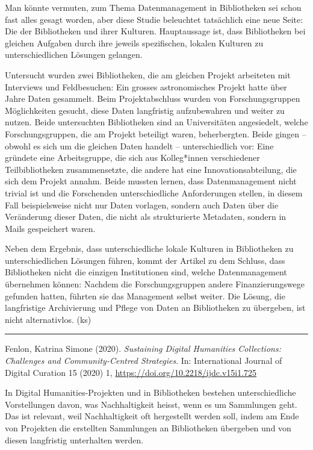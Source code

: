 \documentclass[a4paper,
fontsize=11pt,
oneside,
numbers=noperiodatend,
parskip=half-,
bibliography=totoc,
final
]{scrartcl}
\begin{document}
Man könnte vermuten, zum Thema Datenmanagement in Bibliotheken sei schon
fast alles gesagt worden, aber diese Studie beleuchtet tatsächlich eine
neue Seite: Die der Bibliotheken und ihrer Kulturen. Hauptaussage ist,
dass Bibliotheken bei gleichen Aufgaben durch ihre jeweils spezifischen,
lokalen Kulturen zu unterschiedlichen Lösungen gelangen.

Untersucht wurden zwei Bibliotheken, die am gleichen Projekt arbeiteten
mit Interviews und Feldbesuchen: Ein grosses astronomisches Projekt
hatte über Jahre Daten gesammelt. Beim Projektabschluss wurden von
Forschungsgruppen Möglichkeiten gesucht, diese Daten langfristig
aufzubewahren und weiter zu nutzen. Beide untersuchten Bibliotheken sind
an Universitäten angesiedelt, welche Forschungsgruppen, die am Projekt
beteiligt waren, beherbergten. Beide gingen -- obwohl es sich um die
gleichen Daten handelt -- unterschiedlich vor: Eine gründete eine
Arbeitsgruppe, die sich aus Kolleg*innen verschiedener Teilbibliotheken
zusammensetzte, die andere hat eine Innovationsabteilung, die sich dem
Projekt annahm. Beide mussten lernen, dass Datenmanagement nicht trivial
ist und die Forschenden unterschiedliche Anforderungen stellen, in
diesem Fall beispielsweise nicht nur Daten vorlagen, sondern auch Daten
über die Veränderung dieser Daten, die nicht als strukturierte
Metadaten, sondern in Mails gespeichert waren.

Neben dem Ergebnis, dass unterschiedliche lokale Kulturen in
Bibliotheken zu unterschiedlichen Lösungen führen, kommt der Artikel zu
dem Schluss, dass Bibliotheken nicht die einzigen Institutionen sind,
welche Datenmanagement übernehmen können: Nachdem die Forschungsgruppen
andere Finanzierungswege gefunden hatten, führten sie das Management
selbst weiter. Die Lösung, die langfristige Archivierung und Pflege von
Daten an Bibliotheken zu übergeben, ist nicht alternativlos. (ks)

\begin{center}\rule{0.5\linewidth}{0.5pt}\end{center}

Fenlon, Katrina Simone (2020). \emph{Sustaining Digital Humanities
Collections: Challenges and Community-Centred Strategies}. In:
International Journal of Digital Curation 15 (2020) 1,
\url{https://doi.org/10.2218/ijdc.v15i1.725}

In Digital Humanities-Projekten und in Bibliotheken bestehen
unterschiedliche Vorstellungen davon, was Nachhaltigkeit heisst, wenn es
um Sammlungen geht. Das ist relevant, weil Nachhaltigkeit oft
hergestellt werden soll, indem am Ende von Projekten die erstellten
Sammlungen an Bibliotheken übergeben und von diesen langfristig
unterhalten werden.
\end{document}
